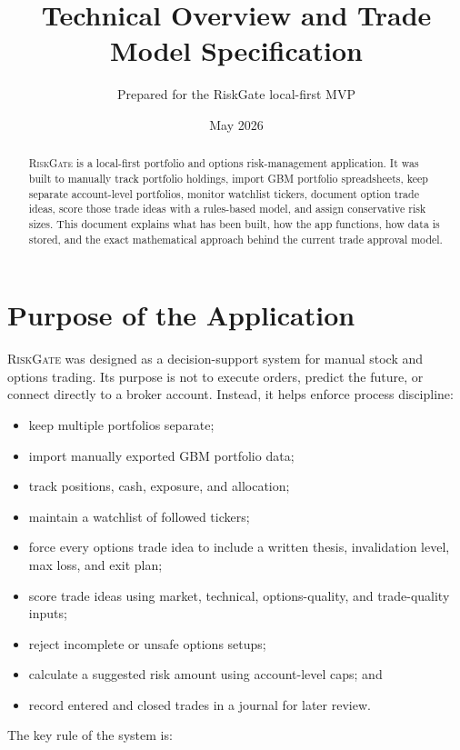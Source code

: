 \documentclass[11pt]{article}
\title{\RiskGate{} Technical Overview and Trade Model Specification}
\author{Prepared for the RiskGate local-first MVP}
\date{May 2026}
\newcommand{\RiskGate}{\textsc{RiskGate}}
\begin{document}
\maketitle

\begin{abstract}
\RiskGate{} is a local-first portfolio and options risk-management application. It was built to manually track portfolio holdings, import GBM portfolio spreadsheets, keep separate account-level portfolios, monitor watchlist tickers, document option trade ideas, score those trade ideas with a rules-based model, and assign conservative risk sizes. This document explains what has been built, how the app functions, how data is stored, and the exact mathematical approach behind the current trade approval model.
\end{abstract}

\tableofcontents
\newpage

\section{Purpose of the Application}

\RiskGate{} was designed as a decision-support system for manual stock and options trading. Its purpose is not to execute orders, predict the future, or connect directly to a broker account. Instead, it helps enforce process discipline:

\begin{itemize}[noitemsep]
  \item keep multiple portfolios separate;
  \item import manually exported GBM portfolio data;
  \item track positions, cash, exposure, and allocation;
  \item maintain a watchlist of followed tickers;
  \item force every options trade idea to include a written thesis, invalidation level, max loss, and exit plan;
  \item score trade ideas using market, technical, options-quality, and trade-quality inputs;
  \item reject incomplete or unsafe options setups;
  \item calculate a suggested risk amount using account-level caps; and
  \item record entered and closed trades in a journal for later review.
\end{itemize}

The key rule of the system is:
\end{document}
